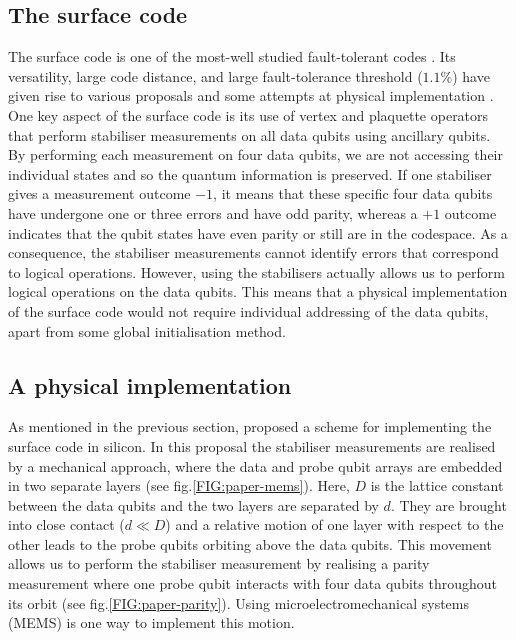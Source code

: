 \subsection{The surface code}
The surface code is one of the most-well studied fault-tolerant codes \cite{Wang2011,Fowler2012}. Its versatility, large code distance, and large fault-tolerance threshold ($1.1\%$) have given rise to various proposals \cite{Fowler2012,Pica2014,Tosi2015,Hill2015,OGorman2016} and some attempts at physical implementation \cite{Barends2014,Kelly2015}. One key aspect of the surface code is its use of vertex and plaquette operators that perform stabiliser measurements on all data qubits using ancillary qubits. By performing each measurement on four data qubits, we are not accessing their individual states and so the quantum information is preserved. If one stabiliser gives a measurement outcome $-1$, it means that these specific four data qubits have undergone one or three errors and have odd parity, whereas a $+1$ outcome indicates that the qubit states have even parity or still are in the codespace. As a consequence, the stabiliser measurements cannot identify errors that correspond to logical operations. However, using the stabilisers actually allows us to perform logical operations on the data qubits. This means that a physical implementation of the surface code would not require individual addressing of the data qubits, apart from some global initialisation method. 







\subsection{A physical implementation} \label{sec:PhysicalImplementation}
As mentioned in the previous section, \citet{OGorman2016} proposed a scheme for implementing the surface code in silicon. In this proposal the stabiliser measurements are realised by a mechanical approach, where the data and probe qubit arrays are embedded in two separate layers (see fig.\@ \ref{FIG:paper-mems}). Here, $D$ is the lattice constant between the data qubits and the two layers are separated by $d$. They are brought into close contact ($d\ll D$) and a relative motion of one layer with respect to the other leads to the probe qubits orbiting above the data qubits. This movement allows us to perform the stabiliser measurement by realising a parity measurement where one probe qubit interacts with four data qubits throughout its orbit (see fig.\@ \ref{FIG:paper-parity}). Using microelectromechanical systems (MEMS) is one way to implement this motion.


